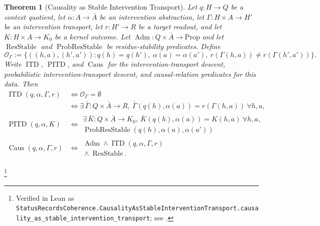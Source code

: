 \documentclass[11pt]{article}
\newtheorem{theorem}{Theorem}[section]
\theoremstyle{definition}
\begin{document}
\begin{theorem}[Causality as Stable Intervention Transport]\label{thm:F25}
Let \(q:H\to Q\) be a context quotient, let
\(\alpha:A\to\bar A\) be an intervention abstraction, let
\(\Gamma:H\times A\to H'\) be an intervention transport, let
\(r:H'\to R\) be a target readout, and let
\(K:H\times A\to K_0\) be a kernel outcome.  Let
\(\operatorname{Adm}:Q\times\bar A\to\mathrm{Prop}\) and let
\(\operatorname{ResStable}\) and
\(\operatorname{ProbResStable}\) be residue-stability predicates.
Define
\[
  \mathcal O_{\Gamma}
  :=
  \{((h,a),(h',a')) :
    q(h)=q(h'),\ \alpha(a)=\alpha(a'),\
    r(\Gamma(h,a))\ne r(\Gamma(h',a'))\}.
\]
Write \(\operatorname{ITD}\), \(\operatorname{PITD}\), and
\(\operatorname{Caus}\) for the intervention-transport descent,
probabilistic intervention-transport descent, and causal-relation
predicates for this data.  Then
\begin{align*}
  \operatorname{ITD}(q,\alpha,\Gamma,r)
  &\iff \mathcal O_{\Gamma}=\emptyset\\
  &\iff
  \exists\,\bar\Gamma:Q\times\bar A\to R,\
    \bar\Gamma(q(h),\alpha(a))=r(\Gamma(h,a))\ \forall h,a,\\
  \operatorname{PITD}(q,\alpha,K)
  &\iff
  \begin{gathered}
    \exists\,\bar K:Q\times\bar A\to K_0,\
    \bar K(q(h),\alpha(a))=K(h,a)\ \forall h,a,\\
    \operatorname{ProbResStable}(q(h),\alpha(a),\alpha(a'))
  \end{gathered}\\
  \operatorname{Caus}(q,\alpha,\Gamma,r)
  &\iff
  \begin{gathered}
    \operatorname{Adm}\wedge
    \operatorname{ITD}(q,\alpha,\Gamma,r)\\
    {}\wedge\operatorname{ResStable}.
  \end{gathered}
\end{align*}
\end{theorem}
\footnote{\raggedright Verified in Lean as
\texttt{StatusRecordsCoherence.\allowbreak{}CausalityAsStable\allowbreak{}InterventionTransport.\allowbreak{}causality\_as\_stable\_\allowbreak{}intervention\_transport};
see .}
\end{document}
